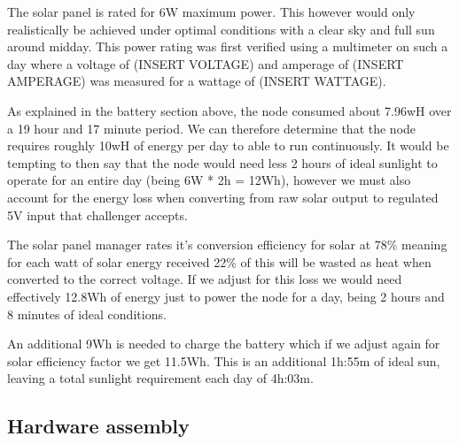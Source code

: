 The solar panel is rated for 6W maximum power. This however would only
realistically be achieved under optimal conditions with a clear sky and full sun
around midday. This power rating was first verified using a multimeter on such a
day where a voltage of (INSERT VOLTAGE) and amperage of (INSERT AMPERAGE) was
measured for a wattage of (INSERT WATTAGE).

As explained in the battery section above, the node consumed about 7.96wH over a
19 hour and 17 minute period. We can therefore determine that the node requires
roughly 10wH of energy per day to able to run continuously. It would be tempting
to then say that the node would need less 2 hours of ideal sunlight to operate
for an entire day (being 6W * 2h = 12Wh), however we must also account for the energy loss when
converting from raw solar output to regulated 5V input that challenger accepts.

The solar panel manager rates it's conversion efficiency for solar at 78\%
meaning for each watt of solar energy received 22\% of this will be wasted as
heat when converted to the correct voltage. If we adjust for this loss we would
need effectively 12.8Wh of energy just to power the node for a day, being 2
hours and 8 minutes of ideal conditions.

An additional 9Wh is needed to charge the battery which if we adjust again for
solar efficiency factor we get 11.5Wh. This is an additional 1h:55m of ideal
sun, leaving a total sunlight requirement each day of 4h:03m.

\subsection{Hardware assembly}